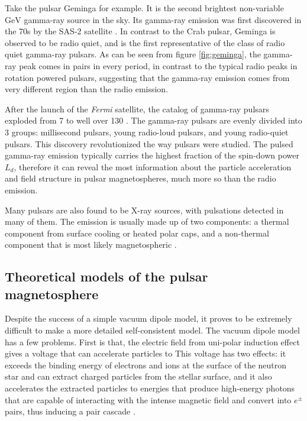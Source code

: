 Take the pulsar Geminga for example. It is the second brightest non-variable
$\mathrm{GeV}$ gamma-ray source in the sky. Its gamma-ray emission was first
discovered in the 70s by the SAS-2 satellite
\citep{fichtel_high-energy_1975,kniffen_distribution_1975}. In contrast to the
Crab pulsar, Geminga is observed to be radio quiet, and is the first
representative of the class of radio quiet gamma-ray pulsars. As can be seen
from figure \ref{fig:geminga}, the gamma-ray peak comes in pairs in every
period, in contrast to the typical radio peaks in rotation powered pulsars,
suggesting that the gamma-ray emission comes from very different region than
the radio emission.

After the launch of the {\it Fermi} satellite, the catalog of gamma-ray pulsars
exploded from 7 to well over 130 \citep{abdo_first_2010,abdo_second_2013}. The
gamma-ray pulsars are evenly divided into 3 groups: millisecond pulsars, young
radio-loud pulsars, and young radio-quiet pulsars. This discovery revolutionized
the way pulsars were studied. The pulsed gamma-ray emission typically carries
the highest fraction of the spin-down power $L_{d}$, therefore it can reveal the
most information about the particle acceleration and field structure in pulsar
magnetospheres, much more so than the radio emission.

Many pulsars are also found to be X-ray sources, with pulsations detected in
many of them. The emission is usually made up of two components: a thermal
component from surface cooling or heated polar caps, and a non-thermal component
that is most likely magnetospheric \citep{kaspi_isolated_2006}.



\subsection{Theoretical models of the pulsar magnetosphere}
\label{sec:intro-pulsar-theory}

Despite the success of a simple vacuum dipole model, it proves to be extremely
difficult to make a more detailed self-consistent model. The vacuum dipole
model has a few problems. First is that, the electric field from
uni-polar induction effect gives a voltage that can accelerate particles to
This voltage has two effects: it exceeds the binding energy of electrons and
ions at the surface of the neutron star and can extract charged particles from
the stellar surface, and it also accelerates the
extracted particles to energies that produce high-energy photons that are
capable of interacting with the intense magnetic field and convert into
$e^{\pm}$ pairs, thus inducing a pair cascade \citep{erber_high-energy_1966}.

